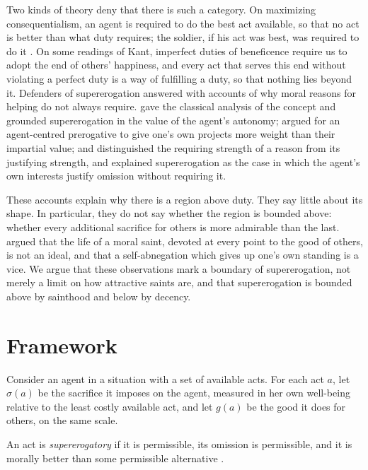 \documentclass{situationist-preprint}
\begin{document}
Two kinds of theory deny that there is such a category. On maximizing consequentialism, an agent is required to do the best act available, so that no act is better than what duty requires; the soldier, if his act was best, was required to do it \citep{Kagan1989}. On some readings of Kant, imperfect duties of beneficence require us to adopt the end of others' happiness, and every act that serves this end without violating a perfect duty is a way of fulfilling a duty, so that nothing lies beyond it. Defenders of supererogation answered with accounts of why moral reasons for helping do not always require. \citet{Heyd1982} gave the classical analysis of the concept and grounded supererogation in the value of the agent's autonomy; \citet{Scheffler1982} argued for an agent-centred prerogative to give one's own projects more weight than their impartial value; \citet{Gert2003} and \citet{Portmore2011} distinguished the requiring strength of a reason from its justifying strength, and explained supererogation as the case in which the agent's own interests justify omission without requiring it.

These accounts explain why there is a region above duty. They say little about its shape. In particular, they do not say whether the region is bounded above: whether every additional sacrifice for others is more admirable than the last. \citet{Wolf1982} argued that the life of a moral saint, devoted at every point to the good of others, is not an ideal, and \citet{Hill1973} that a self-abnegation which gives up one's own standing is a vice. We argue that these observations mark a boundary of supererogation, not merely a limit on how attractive saints are, and that supererogation is bounded above by sainthood and below by decency.

\section{Framework}

Consider an agent in a situation with a set of available acts. For each act $a$, let $\sigma(a)$ be the sacrifice it imposes on the agent, measured in her own well-being relative to the least costly available act, and let $g(a)$ be the good it does for others, on the same scale.

\begin{definition}[Supererogation]\label{d:super}
An act is \emph{supererogatory} if it is permissible, its omission is permissible, and it is morally better than some permissible alternative \citep{Heyd1982}.
\end{definition}
\end{document}
